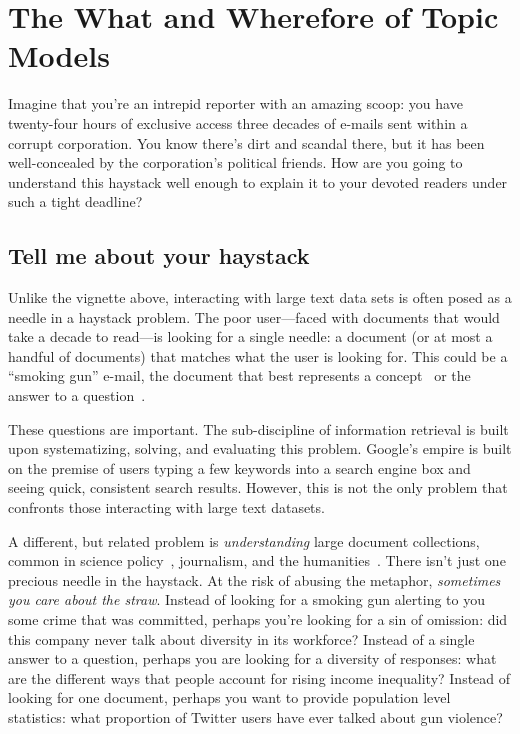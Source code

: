 
\chapter{The What and Wherefore of Topic Models}
\label{ch:intro}

Imagine that you're an intrepid reporter with an amazing scoop: you have
twenty-four hours of exclusive access three decades of e-mails sent within a
corrupt corporation.  You know there's dirt and scandal there, but it has been
well-concealed by the corporation's political friends.  How are you going to
understand this haystack well enough to explain it to your devoted readers under
such a tight deadline?

\section{Tell me about your haystack}

Unlike the vignette above, interacting with large text data sets is often posed
as a needle in a haystack problem.  The poor user---faced with documents that
would take a decade to read---is looking for a single needle: a document (or at
most a handful of documents) that matches what the user is looking for.  This
could be a ``smoking gun'' e-mail, the document that best represents a
concept~\citep{Salton-68} or the answer to a question~\citep{Hirschman-01}.

These questions are important.  The sub-discipline of information retrieval is
built upon systematizing, solving, and evaluating this problem.  Google's empire
is built on the premise of users typing a few keywords into a search engine box
and seeing quick, consistent search results.  However, this is not the only
problem that confronts those interacting with large text datasets.

A different, but related problem is \emph{understanding} large document
collections, common in science policy~\citep{talley-11}, journalism, and the
humanities~\citep{moretti-13}.  There isn't just one precious needle in
the haystack.  At the risk of abusing the metaphor, \emph{sometimes you care
  about the straw}.  Instead of looking for a smoking gun alerting to you some
crime that was committed, perhaps you're looking for a sin of
omission: did this company never talk about diversity in its workforce?
Instead of a single answer to a question, perhaps you are looking for a diversity
of responses: what are the different ways that people account for rising income
inequality?  Instead of looking for one document, perhaps you want to provide
population level statistics: what proportion of Twitter users have ever talked
about gun violence?

